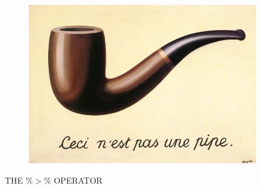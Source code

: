 \documentclass[MASTER.tex]{subfiles}
\begin{document}
 

	\begin{frame}
		\begin{figure}
\centering
\includegraphics[width=0.99\linewidth]{images/pipe}

\end{figure}
\begin{center}
		{\huge THE $ \%>\% $ OPERATOR}
\end{center}

		
		
	\end{frame}
	
\end{document}
